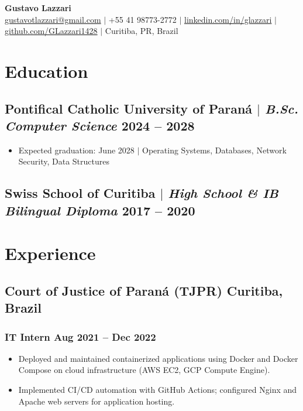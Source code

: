 \documentclass[10pt]{article}
\begin{document}
\begin{center}
	{\LARGE\bfseries Gustavo Lazzari} \\
	\vspace{2pt}
	\href{mailto:gustavotlazzari@gmail.com}{gustavotlazzari@gmail.com} $|$
	+55 41 98773-2772 $|$
	\href{https://www.linkedin.com/in/glazzari}{linkedin.com/in/glazzari} $|$
	\href{https://github.com/GLazzari1428}{github.com/GLazzari1428} $|$
	Curitiba, PR, Brazil
\end{center}

\section{Education}
\subsection{Pontifical Catholic University of Paran\'{a} $|$ {\normalfont\itshape B.Sc. Computer Science} \hfill 2024 -- 2028}
\begin{itemize}
	\item Expected graduation: June 2028 $|$ Operating Systems, Databases, Network Security, Data Structures
\end{itemize}
\subsection{Swiss School of Curitiba $|$ {\normalfont\itshape High School \& IB Bilingual Diploma} \hfill 2017 -- 2020}

\section{Experience}
\subsection{Court of Justice of Paran\'{a} (TJPR) \hfill Curitiba, Brazil}
\subsubsection{IT Intern \hfill Aug 2021 -- Dec 2022}
\begin{itemize}
	\item Deployed and maintained containerized applications using Docker and Docker Compose on cloud infrastructure (AWS EC2, GCP Compute Engine).
	\item Implemented CI/CD automation with GitHub Actions; configured Nginx and Apache web servers for application hosting.
\end{itemize}
\end{document}
